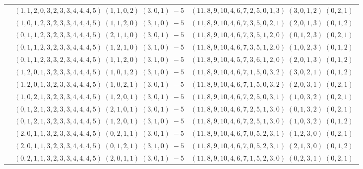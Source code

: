 \documentclass[11pt]{article}
\begin{document}
\begin{longtable}[l]{|c|c|c|}
 \cline{2-3} 
 & $(1 ,1 ,2 ,0 ,3 ,2 ,3 ,3 ,4 ,4 ,4 ,5) \;(1 ,1 ,0 ,2) \;(3 ,0 ,1) \;-5$ & $(11 ,8 ,9 ,10 ,4 ,6 ,7 ,2 ,5 ,0 ,1 ,3) \;(3 ,0 ,1 ,2) \;(0 ,2 ,1) \;$\\ 
 \cline{2-3} 
 & $(1 ,0 ,1 ,2 ,3 ,2 ,3 ,3 ,4 ,4 ,4 ,5) \;(1 ,1 ,2 ,0) \;(3 ,1 ,0) \;-5$ & $(11 ,8 ,9 ,10 ,4 ,6 ,7 ,3 ,5 ,0 ,2 ,1) \;(2 ,0 ,1 ,3) \;(0 ,1 ,2) \;$\\ 
 \cline{2-3} 
 & $(0 ,1 ,1 ,2 ,3 ,2 ,3 ,3 ,4 ,4 ,4 ,5) \;(2 ,1 ,1 ,0) \;(3 ,0 ,1) \;-5$ & $(11 ,8 ,9 ,10 ,4 ,6 ,7 ,3 ,5 ,1 ,2 ,0) \;(0 ,1 ,2 ,3) \;(0 ,2 ,1) \;$\\ 
 \cline{2-3} 
 & $(0 ,1 ,1 ,2 ,3 ,2 ,3 ,3 ,4 ,4 ,4 ,5) \;(1 ,2 ,1 ,0) \;(3 ,1 ,0) \;-5$ & $(11 ,8 ,9 ,10 ,4 ,6 ,7 ,3 ,5 ,1 ,2 ,0) \;(1 ,0 ,2 ,3) \;(0 ,1 ,2) \;$\\ 
 \cline{2-3} 
 & $(0 ,1 ,1 ,2 ,3 ,3 ,2 ,3 ,4 ,4 ,4 ,5) \;(1 ,1 ,2 ,0) \;(3 ,1 ,0) \;-5$ & $(11 ,8 ,9 ,10 ,4 ,5 ,7 ,3 ,6 ,1 ,2 ,0) \;(2 ,0 ,1 ,3) \;(0 ,1 ,2) \;$\\ 
 \cline{2-3} 
 & $(1 ,2 ,0 ,1 ,3 ,2 ,3 ,3 ,4 ,4 ,4 ,5) \;(1 ,0 ,1 ,2) \;(3 ,1 ,0) \;-5$ & $(11 ,8 ,9 ,10 ,4 ,6 ,7 ,1 ,5 ,0 ,3 ,2) \;(3 ,0 ,2 ,1) \;(0 ,1 ,2) \;$\\ 
 \cline{2-3} 
 & $(1 ,2 ,0 ,1 ,3 ,2 ,3 ,3 ,4 ,4 ,4 ,5) \;(1 ,0 ,2 ,1) \;(3 ,0 ,1) \;-5$ & $(11 ,8 ,9 ,10 ,4 ,6 ,7 ,1 ,5 ,0 ,3 ,2) \;(2 ,0 ,3 ,1) \;(0 ,2 ,1) \;$\\ 
 \cline{2-3} 
 & $(1 ,0 ,2 ,1 ,3 ,2 ,3 ,3 ,4 ,4 ,4 ,5) \;(1 ,2 ,0 ,1) \;(3 ,0 ,1) \;-5$ & $(11 ,8 ,9 ,10 ,4 ,6 ,7 ,2 ,5 ,0 ,3 ,1) \;(1 ,0 ,3 ,2) \;(0 ,2 ,1) \;$\\ 
 \cline{2-3} 
 & $(0 ,1 ,2 ,1 ,3 ,2 ,3 ,3 ,4 ,4 ,4 ,5) \;(2 ,1 ,0 ,1) \;(3 ,0 ,1) \;-5$ & $(11 ,8 ,9 ,10 ,4 ,6 ,7 ,2 ,5 ,1 ,3 ,0) \;(0 ,1 ,3 ,2) \;(0 ,2 ,1) \;$\\ 
 \cline{2-3} 
 & $(0 ,1 ,2 ,1 ,3 ,2 ,3 ,3 ,4 ,4 ,4 ,5) \;(1 ,2 ,0 ,1) \;(3 ,1 ,0) \;-5$ & $(11 ,8 ,9 ,10 ,4 ,6 ,7 ,2 ,5 ,1 ,3 ,0) \;(1 ,0 ,3 ,2) \;(0 ,1 ,2) \;$\\ 
 \cline{2-3} 
 & $(2 ,0 ,1 ,1 ,3 ,2 ,3 ,3 ,4 ,4 ,4 ,5) \;(0 ,2 ,1 ,1) \;(3 ,0 ,1) \;-5$ & $(11 ,8 ,9 ,10 ,4 ,6 ,7 ,0 ,5 ,2 ,3 ,1) \;(1 ,2 ,3 ,0) \;(0 ,2 ,1) \;$\\ 
 \cline{2-3} 
 & $(2 ,0 ,1 ,1 ,3 ,2 ,3 ,3 ,4 ,4 ,4 ,5) \;(0 ,1 ,2 ,1) \;(3 ,1 ,0) \;-5$ & $(11 ,8 ,9 ,10 ,4 ,6 ,7 ,0 ,5 ,2 ,3 ,1) \;(2 ,1 ,3 ,0) \;(0 ,1 ,2) \;$\\ 
 \cline{2-3} 
 & $(0 ,2 ,1 ,1 ,3 ,2 ,3 ,3 ,4 ,4 ,4 ,5) \;(2 ,0 ,1 ,1) \;(3 ,0 ,1) \;-5$ & $(11 ,8 ,9 ,10 ,4 ,6 ,7 ,1 ,5 ,2 ,3 ,0) \;(0 ,2 ,3 ,1) \;(0 ,2 ,1) \;$\\ 

\end{longtable}
\end{document}
